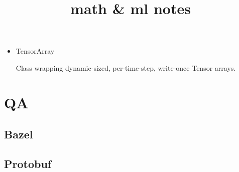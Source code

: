 \documentclass[10pt,a4paper]{book}
\title{math & ml notes}
\begin{document}
\chapter{}
\begin{itemize}
	\item TensorArray
	
	Class wrapping dynamic-sized, per-time-step, write-once Tensor arrays.
\end{itemize}


\chapter{QA}
\section {Bazel}

\section {Protobuf}
\end{document}
